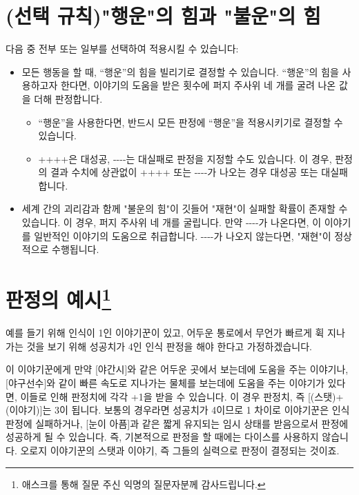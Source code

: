 \documentclass{report}
\begin{document}
	\section*{(선택 규칙)"행운"의 힘과 "불운"의 힘}
	다음 중 전부 또는 일부를 선택하여 적용시킬 수 있습니다:
	\begin{itemize}
		\item 모든 행동을 할 때, “행운”의 힘을 빌리기로 결정할 수 있습니다. “행운”의 힘을 사용하고자 한다면, 이야기의 도움을 받은 횟수에 퍼지 주사위 네 개를 굴려 나온 값을 더해 판정합니다.
		
		\begin{itemize}
			\item “행운”을 사용한다면, 반드시 모든 판정에 “행운”을 적용시키기로 결정할 수 있습니다.
			
			\item ++++은 대성공, -{}-{}-{}-는 대실패로 판정을 지정할 수도 있습니다. 이 경우, 판정의 결과 수치에 상관없이 ++++ 또는 -{}-{}-{}-가 나오는 경우 대성공 또는 대실패합니다.
		\end{itemize}
		
		\item 세계 간의 괴리감과 함께 "불운의 힘"이 깃들어 "재현"이 실패할 확률이 존재할 수 있습니다. 이 경우, 퍼지 주사위 네 개를 굴립니다. 만약 -{}-{}-{}-가 나온다면, 이 이야기를 일반적인 이야기의 도움으로 취급합니다. -{}-{}-{}-가 나오지 않는다면, "재현"이 정상적으로 수행됩니다.
	\end{itemize}
	
	\section*{판정의 예시\footnote{애스크를 통해 질문 주신 익명의 질문자분께 감사드립니다.}}
	
	예를 들기 위해 인식이 1인 이야기꾼이 있고, 어두운 통로에서 무언가 빠르게 휙 지나가는 것을 보기 위해 성공치가 4인 인식 판정을 해야 한다고 가정하겠습니다.
	
	이 이야기꾼에게 만약 [야간시]와 같은 어두운 곳에서 보는데에 도움을 주는 이야기나, [야구선수]와 같이 빠른 속도로 지나가는 물체를 보는데에 도움을 주는 이야기가 있다면, 이들로 인해 판정치에 각각 +1을 받을 수 있습니다. 이 경우 판정치, 즉 [(스탯)+(이야기)]는 3이 됩니다. 보통의 경우라면 성공치가 4이므로 1 차이로 이야기꾼은 인식 판정에 실패하거나, [눈이 아픔]과 같은 짧게 유지되는 임시 상태를 받음으로서 판정에 성공하게 될 수 있습니다. 즉, 기본적으로 판정을 할 때에는 다이스를 사용하지 않습니다. 오로지 이야기꾼의 스탯과 이야기, 즉 그들의 실력으로 판정이 결정되는 것이죠.
	
\end{document}
